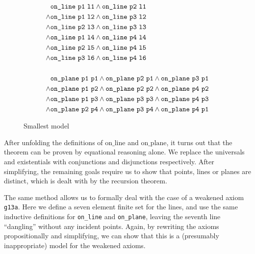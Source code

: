 \begin{figure}
\begin{minipage}[c]{5cm}
\begin{align*}
& \texttt{on\_line}\ \texttt{p1}\ \texttt{l1}\wedge \texttt{on\_line}\ \texttt{p2}\ \texttt{l1}\\
\wedge & \texttt{on\_line}\ \texttt{p1}\ \texttt{l2}\wedge \texttt{on\_line}\ \texttt{p3}\ \texttt{l2}\\
\wedge & \texttt{on\_line}\ \texttt{p2}\ \texttt{l3}\wedge \texttt{on\_line}\ \texttt{p3}\ \texttt{l3}\\
\wedge & \texttt{on\_line}\ \texttt{p1}\ \texttt{l4}\wedge \texttt{on\_line}\ \texttt{p4}\ \texttt{l4}\\
\wedge & \texttt{on\_line}\ \texttt{p2}\ \texttt{l5}\wedge \texttt{on\_line}\ \texttt{p4}\ \texttt{l5}\\
\wedge & \texttt{on\_line}\ \texttt{p3}\ \texttt{l6}\wedge \texttt{on\_line}\ \texttt{p4}\ \texttt{l6}\\
\\
& \texttt{on\_plane}\ \texttt{p1}\ \texttt{p1}\wedge \texttt{on\_plane}\ \texttt{p2}\ \texttt{p1}\wedge \texttt{on\_plane}\ \texttt{p3}\ \texttt{p1}\\
\wedge & \texttt{on\_plane}\ \texttt{p1}\ \texttt{p2}\wedge \texttt{on\_plane}\ \texttt{p2}\ \texttt{p2}\wedge \texttt{on\_plane}\ \texttt{p4}\ \texttt{p2}\\
\wedge & \texttt{on\_plane}\ \texttt{p1}\ \texttt{p3}\wedge \texttt{on\_plane}\ \texttt{p3}\ \texttt{p3}\wedge \texttt{on\_plane}\ \texttt{p4}\ \texttt{p3}\\
\wedge & \texttt{on\_plane}\ \texttt{p2}\ \texttt{p4}\wedge \texttt{on\_plane}\ \texttt{p3}\ \texttt{p4}\wedge \texttt{on\_plane}\ \texttt{p4}\ \texttt{p1}
\end{align*}\end{minipage}%
\caption{Smallest model}\label{fig:SmallestModel}
\end{figure}

After unfolding the definitions of $\text{on\_line}$ and $\text{on\_plane}$, it turns out that the theorem can be proven by equational reasoning alone. We replace the universals and existentials with conjunctions and disjunctions respectively. After simplifying, the remaining goals require us to show that points, lines or planes are distinct, which is dealt with by the recursion theorem.

The same method allows us to formally deal with the case of a weakened axiom \texttt{g13a}. Here we define a seven element finite set for the lines, and use the same inductive definitions for \texttt{on\_line} and \texttt{on\_plane}, leaving the seventh line ``dangling'' without any incident points. Again, by rewriting the axioms propositionally and simplifying, we can show that this is a (presumably inappropriate) model for the weakened axioms.

